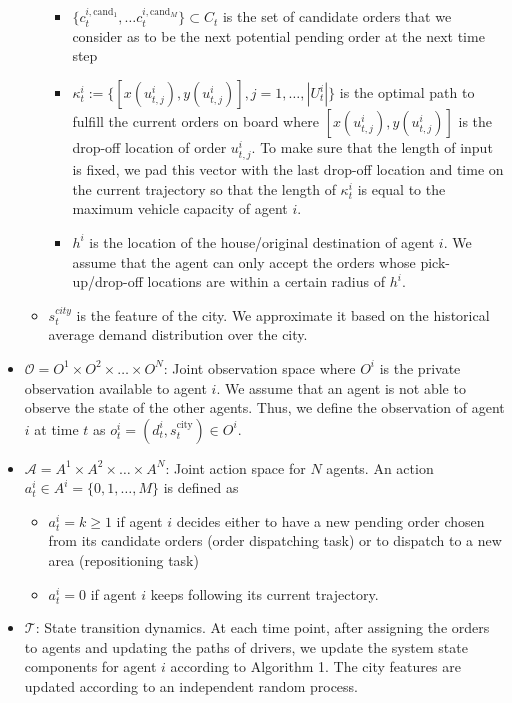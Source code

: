 \documentclass{article}
\theoremstyle{defn}
\theoremstyle{prop}
\theoremstyle{assm}
\theoremstyle{theoremm}
\theoremstyle{remarkk}
\theoremstyle{lem}
\theoremstyle{example}
\theoremstyle{example}
\begin{document}
\begin{itemize}[leftmargin=*]
\begin{itemize}
\begin{itemize}
            \item $\{c_t^{i,\text{cand}_1}, \ldots c_t^{i,\text{cand}_M}\} \subset C_t$ is the set of candidate orders that we consider as to be the next potential pending order at the next time step
            \item $\kappa_t^i := \{[x(u_{t,j}^i), y(u_{t,j}^i)], j=1, \ldots ,|U_t^i|\}$ is the optimal path to fulfill the current orders on board where $[x(u_{t,j}^i), y(u_{t,j}^i)]$ is the drop-off location of order $u_{t,j}^i$. To make sure that the length of input is fixed, we pad this vector with the last drop-off location and time on the current trajectory so that the length of $\kappa_t^i$ is equal to the maximum vehicle capacity of agent $i$.
        \item $h^i$ is the location of the house/original destination of agent $i$. We assume that the agent can only accept the orders whose pick-up/drop-off locations are within a certain radius of $h^i$.
        \end{itemize}
        \item $s_t^{city}$ is the feature of the city. We approximate it based on the historical average demand distribution over the city.
    \end{itemize}
    \item $\mathcal{O} = O^1 \times O^2 \times \ldots \times O^N$: Joint observation space where $O^i$ is the private observation available to agent $i$. We assume that an agent is not able to observe the state of the other agents. Thus, we define the observation of agent $i$ at time $t$ as $o_t^i = (d^i_t, s_t^{\text{city}}) \in O^i$.
    \item $\mathcal{A} = A^1 \times A^2 \times \ldots \times A^N$: Joint action space for $N$ agents. An action $a^i_t \in A^i=\{0, 1, \ldots, M\}$ is defined as 
    \begin{itemize}
        \item $a^i_t = k \geq 1$ if agent $i$ decides either to have a new pending order chosen from its candidate orders (order dispatching task) or to dispatch to a new area (repositioning task)
        \item $a^i_t = 0$ if agent $i$ keeps following its current trajectory.
    \end{itemize}
    \item $\mathcal{T}$: State transition dynamics. At each time point, after assigning the orders to agents and updating the paths of drivers, we update the system state components for agent $i$ according to Algorithm 1. The city features are updated according to an independent random process.

\end{itemize}
\end{document}
